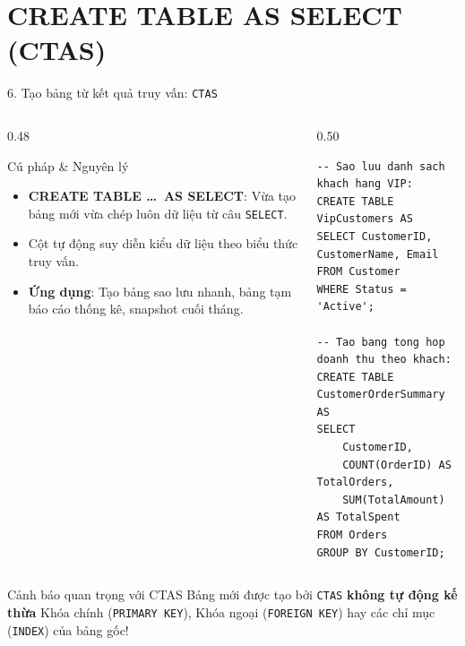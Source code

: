 \documentclass[aspectratio=169,11pt]{beamer}
\newcommand{\kw}[1]{\textcolor{dbblue}{\textbf{#1}}}
\newcommand{\smallgap}{\vspace{0.2em}}
\begin{document}
\section{CREATE TABLE AS SELECT (CTAS)}
\begin{frame}[fragile]{6. Tạo bảng từ kết quả truy vấn: \texttt{CTAS}}
\begin{columns}[t]
  \begin{column}{0.48\textwidth}
    \begin{block}{Cú pháp \& Nguyên lý}
      \begin{itemize}\setlength{\itemsep}{1.5pt}
        \item \kw{CREATE TABLE \dots\ AS SELECT}: Vừa tạo bảng mới vừa chép luôn dữ liệu từ câu \texttt{SELECT}.
        \item Cột tự động suy diễn kiểu dữ liệu theo biểu thức truy vấn.
        \item \kw{Ứng dụng}: Tạo bảng sao lưu nhanh, bảng tạm báo cáo thống kê, snapshot cuối tháng.
      \end{itemize}
    \end{block}
  \end{column}
  \begin{column}{0.50\textwidth}
\begin{lstlisting}
-- Sao luu danh sach khach hang VIP:
CREATE TABLE VipCustomers AS
SELECT CustomerID, CustomerName, Email
FROM Customer
WHERE Status = 'Active';

-- Tao bang tong hop doanh thu theo khach:
CREATE TABLE CustomerOrderSummary AS
SELECT 
    CustomerID,
    COUNT(OrderID) AS TotalOrders,
    SUM(TotalAmount) AS TotalSpent
FROM Orders
GROUP BY CustomerID;
\end{lstlisting}
  \end{column}
\end{columns}

\smallgap
\begin{alertblock}{Cảnh báo quan trọng với CTAS}
  Bảng mới được tạo bởi \texttt{CTAS} \textbf{không tự động kế thừa} Khóa chính (\texttt{PRIMARY KEY}), Khóa ngoại (\texttt{FOREIGN KEY}) hay các chỉ mục (\texttt{INDEX}) của bảng gốc!
\end{alertblock}
\end{frame}

\end{document}
